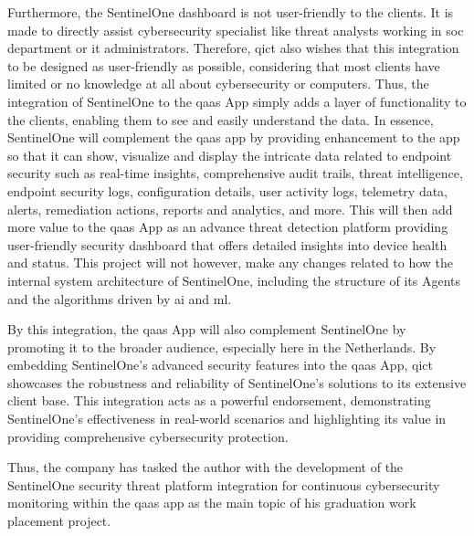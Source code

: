 Furthermore, the SentinelOne dashboard is not user-friendly to the clients. It is made to directly assist cybersecurity
specialist like threat analysts working in \acrshort{soc} department or \acrshort{it} administrators. Therefore,
\acrshort{qict} also wishes that this integration to be designed as user-friendly as possible, considering
that most clients have limited or no knowledge at all about cybersecurity or computers. Thus, the integration of SentinelOne to the
\acrshort{qaas} App simply adds a layer of functionality to the clients, enabling them to see and easily
understand the data. In essence, SentinelOne will complement the \acrshort{qaas} app by providing enhancement to the
app so that it can show, visualize and display the intricate data related to endpoint security such as real-time insights,
comprehensive audit trails, threat intelligence, endpoint security logs, configuration details, user activity logs, telemetry data,
alerts, remediation actions, reports and analytics, and more. This will then add more value to the \acrshort{qaas} App as an advance
threat detection platform providing user-friendly security dashboard that offers detailed insights into device health and status. This
project will not however, make any changes related to how the internal system architecture of SentinelOne, including the structure of
its Agents and the algorithms driven by \acrshort{ai} and \acrshort{ml}.

By this integration, the \acrshort{qaas} App will also complement SentinelOne by promoting it to the broader audience, especially here
in the Netherlands. By embedding SentinelOne's advanced security features into the \acrshort{qaas} App, \acrshort{qict} showcases the
robustness and reliability of SentinelOne's solutions to its extensive client base. This integration acts as a powerful endorsement,
demonstrating SentinelOne's effectiveness in real-world scenarios and highlighting its value in providing comprehensive cybersecurity
protection.

Thus, the company has tasked the author with the development of the SentinelOne security threat platform
integration for continuous cybersecurity monitoring within the \acrshort{qaas} app as the main topic of his
graduation work  placement project.

